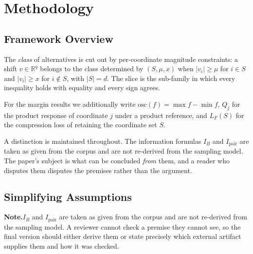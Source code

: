 \documentclass[conference]{IEEEtran}
\theoremstyle{definition}
\newif\ifshownotes\shownotestrue
\newcommand{\NOTEPAR}[1]{\ifshownotes\par\vspace{2pt}\noindent%
  {\color{notecol}\textsf{\footnotesize\textbf{Note.}\;#1}}\par\vspace{2pt}\fi}
\begin{document}
\section{Methodology}
\label{sec:setting}

\subsection{Framework Overview}

The \emph{class} of alternatives is cut out by per-coordinate magnitude constraints: a shift
$v\in\mathbb{R}^{q}$ belongs to the class determined by $(S,\mu,x)$ when $|v_{i}|\ge\mu$ for
$i\in S$ and $|v_{i}|\ge x$ for $i\notin S$, with $|S|=d$. The slice is the sub-family in
which every inequality holds with equality and every sign agrees.

For the margin results we additionally write $\mathrm{osc}(f)=\max f-\min f$, $Q_{j}$ for the
product response of coordinate $j$ under a product reference, and $L_{F}(S)$ for the
compression loss of retaining the coordinate set $S$.

A distinction is maintained throughout. The information formulas $I_{B}$ and
$I_{\mathrm{pair}}$ are taken as given from the corpus and are not re-derived from the
sampling model. The paper's subject is what can be concluded \emph{from} them, and a reader
who disputes them disputes the premises rather than the argument.

\subsection{Simplifying Assumptions}
\NOTEPAR{$I_{B}$ and $I_{\mathrm{pair}}$ are taken as given from the corpus and are not
re-derived from the sampling model. A reviewer cannot check a premise they cannot see, so the
final version should either derive them or state precisely which external artifact supplies
them and how it was checked.}
\end{document}
